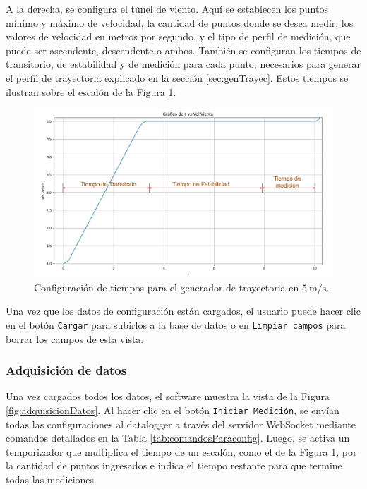 A la derecha, se configura el túnel de viento. Aquí se establecen los puntos mínimo y máximo de velocidad, la cantidad de puntos donde se desea medir, los valores de velocidad en metros por segundo, y el tipo de perfil de medición, que puede ser ascendente, descendente o ambos. También se configuran los tiempos de transitorio, de estabilidad y de medición para cada punto, necesarios para generar el perfil de trayectoria explicado en la sección \ref{sec:genTrayec}. Estos tiempos se ilustran sobre el escalón de la Figura \ref{fig:curvaEscalon}.

\begin{figure}[H]
    \centering
    \includegraphics[width=1\linewidth]{Figuras/AplicacionWeb/frondend/curvaEscalon.png}
    \caption{Configuración de tiempos para el generador de trayectoria en $\SI{5}{\meter\per\second}$.}
    \label{fig:curvaEscalon}
\end{figure}

Una vez que los datos de configuración están cargados, el usuario puede hacer clic en el botón \texttt{Cargar} para subirlos a la base de datos o en \texttt{Limpiar campos} para borrar los campos de esta vista.


\subsubsection{Adquisición de datos}\label{sec:adquisicionDatos}

Una vez cargados todos los datos, el software muestra la vista de la Figura \ref{fig:adquisicionDatos}. Al hacer clic en el botón \texttt{Iniciar Medición}, se envían todas las configuraciones al datalogger a través del servidor WebSocket mediante comandos detallados en la Tabla \ref{tab:comandosParaconfig}. Luego, se activa un temporizador que multiplica el tiempo de un escalón, como el de la Figura \ref{fig:curvaEscalon}, por la cantidad de puntos ingresados e indica el tiempo restante para que termine todas las mediciones. 

